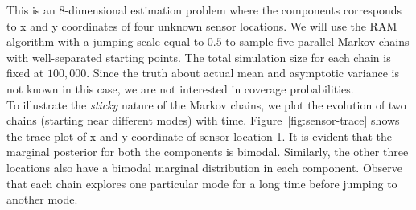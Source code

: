 \documentclass[11pt]{article}
\theoremstyle{remark}
\begin{document}
This is an 8-dimensional estimation problem where the components corresponds to x and y coordinates of four unknown sensor locations. We will use the RAM algorithm with a jumping scale equal to $0.5$ to sample five parallel Markov chains with well-separated starting points. The total simulation size for each chain is fixed at $100,000$. Since the truth about actual mean and asymptotic variance is not known in this case, we are not interested in coverage probabilities.\\

To illustrate the \textit{sticky} nature of the Markov chains, we plot the evolution of two chains (starting near different modes) with time. Figure~\ref{fig:sensor-trace} shows the trace plot of x and y coordinate of sensor location-1. It is evident that the marginal posterior for both the components is bimodal. Similarly, the other three locations also have a bimodal marginal distribution in each component.  Observe that each chain explores one particular mode for a long time before jumping to another mode. \\
\end{document}
